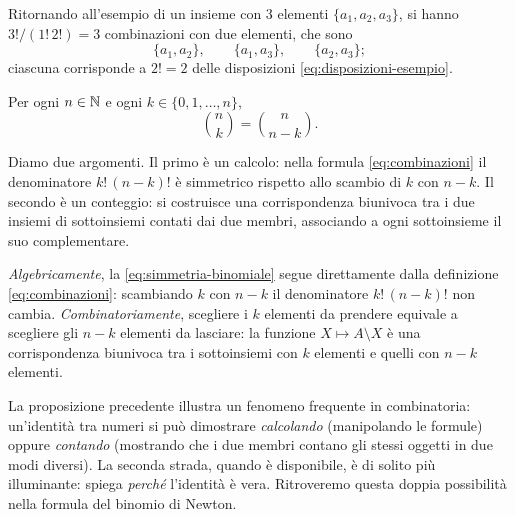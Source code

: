Ritornando all'esempio di un insieme con $3$ elementi $\{a_{1},a_{2},a_{3}\}$, si hanno
$3!/(1!\,2!)=3$ combinazioni con due elementi, che sono
\begin{equation}\label{eq:combinazioni-esempio}
  \{a_{1},a_{2}\},\qquad \{a_{1},a_{3}\},\qquad \{a_{2},a_{3}\};
\end{equation}
ciascuna corrisponde a $2!=2$ delle disposizioni \eqref{eq:disposizioni-esempio}.

\begin{proposizione}\label{prop:simmetria-binomiale}
Per ogni $n\in\mathbb{N}$ e ogni $k\in\{0,1,\dots,n\}$,
\begin{equation}\label{eq:simmetria-binomiale}
  \binom nk=\binom{n}{n-k}.
\end{equation}
\end{proposizione}

\begin{schema}
\end{schema}

\begin{strategia}
Diamo due argomenti. Il primo è un calcolo: nella formula \eqref{eq:combinazioni} il
denominatore $k!\,(n-k)!$ è simmetrico rispetto allo scambio di $k$ con $n-k$. Il
secondo è un conteggio: si costruisce una corrispondenza biunivoca tra i due insiemi di
sottoinsiemi contati dai due membri, associando a ogni sottoinsieme il suo complementare.
\end{strategia}

\begin{dimostrazione}
\emph{Algebricamente}, la \eqref{eq:simmetria-binomiale} segue direttamente dalla
definizione \eqref{eq:combinazioni}: scambiando $k$ con $n-k$ il denominatore
$k!\,(n-k)!$ non cambia. \emph{Combinatoriamente}, scegliere i $k$ elementi da prendere
equivale a scegliere gli $n-k$ elementi da lasciare: la funzione $X\mapsto A\setminus X$
è una corrispondenza biunivoca tra i sottoinsiemi con $k$ elementi e quelli con $n-k$
elementi.
\end{dimostrazione}

\begin{idea}
La proposizione precedente illustra un fenomeno frequente in combinatoria: un'identità
tra numeri si può dimostrare \emph{calcolando} (manipolando le formule) oppure
\emph{contando} (mostrando che i due membri contano gli stessi oggetti in due modi
diversi). La seconda strada, quando è disponibile, è di solito più illuminante: spiega
\emph{perché} l'identità è vera. Ritroveremo questa doppia possibilità nella formula del
binomio di Newton.
\end{idea}

